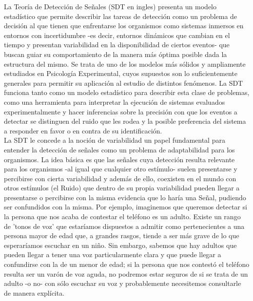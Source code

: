 La Teoría de Detección de Señales (SDT en ingles) presenta un modelo estadístico que permite describir las tareas de detección como un problema de decisión al que tienen que enfrentarse los organismos como sistemas inmersos en entornos con incertidumbre -es decir, entornos dinámicos que cambian en el tiempo y presentan variabilidad en la disponibilidad de ciertos eventos- que buscan guiar su comportamiento de la manera más óptima posible dada la estructura del mismo. Se trata de uno de los modelos más sólidos y ampliamente estudiados en Psicología Experimental, cuyos supuestos son lo suficientemente generales para permitir su aplicación al estudio de distintos fenómenos. La SDT funciona tanto como un modelo estadístico para describir esta clase de problemas, como una herramienta para interpretar la ejecución de  sistemas evaluados experimentalmente y hacer inferencias sobre la precisión con que los eventos a detectar se distinguen del ruido que les rodea y la posible preferencia del sistema a responder en favor o en contra de su identificación.\\

La SDT le concede a la noción de variabilidad un papel fundamental para entender la detección de señales como un problema de adaptabilidad para los organismos. La idea básica es que las señales cuya detección resulta relevante para los organismos -al igual que cualquier otro estímulo- suelen presentarse y percibirse con cierta variabilidad y además de ello, coexisten en el mundo con otros estímulos (el Ruido) que dentro de su propia variabilidad pueden llegar a presentarse o percibirse con la misma evidencia que lo haría una Señal, pudiendo ser confundidos con la misma. Por ejemplo, imaginemos que queremos detectar si la persona que nos acaba de contestar el teléfono es un adulto. Existe un rango de 'tonos de voz' que estaríamos dispuestos a admitir como pertenecientes a una persona mayor de edad que, a grandes rasgos, tiende a ser más grave de lo que esperaríamos escuchar en un niño. Sin embargo, sabemos que hay adultos que pueden llegar a tener una voz particularmente clara y que puede llegar a confundirse con la de un menor de edad; si la persona que nos contestó el teléfono resulta ser un varón de voz aguda, no podremos estar seguros de si se trata de un adulto -o no- con sólo escuchar su voz y probablemente necesitemos consultarle de manera explícita.\\

